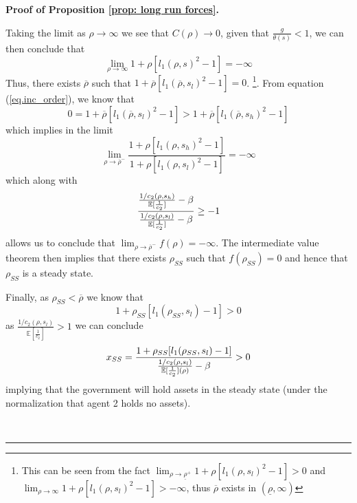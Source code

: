 \documentclass[thmsb,11pt]{article}
\newenvironment{proof}[1][Proof]{\noindent \textbf{#1.} }{\  \rule{0.5em}{0.5em}}
\begin{document}
\begin{proof}[Proof of Proposition \ref{prop: long run forces}]
\begin{description}
Taking the limit as $\rho\rightarrow\infty$ we see that $C(\rho)\rightarrow
0 $, given that $\frac g{\theta(s)} <1$, we can then conclude that
\begin{equation*}
\lim_{\rho\rightarrow\infty } 1+ \rho[l_1(\rho,s)^2-1] = -\infty
\end{equation*}
Thus, there exists $\overline \rho$ such that $1+\overline \rho[%
l_1(\overline \rho,s_l)^2-1] = 0$. \footnote{This can be seen from the fact $\lim_{\rho\rightarrow \underline
\rho^+} 1+\rho[l_1(\rho,s_l)^2 -1] > 0$ and $\lim_{\rho\rightarrow \infty } 1+\rho[l_1(\rho,s_l)^2 -1] > -\infty$, thus $\overline{\rho}$ exists in $(\underline{\rho},\infty)$ }. From equation (\ref{eq.inc_order}), we
know that
\begin{equation*}
0 = 1+\overline \rho[l_1(\overline \rho,s_l)^2-1] > 1+\overline \rho[%
l_1(\overline \rho,s_h)^2-1]
\end{equation*}
which implies in the limit
\begin{equation*}
\lim_{\rho\rightarrow \overline \rho^-}\frac{1+\rho[l_1(\rho,s_h)^2-1]}{1+%
\rho[l_1(\rho,s_l)^2-1]} = -\infty
\end{equation*}
which along with
\begin{equation*}
\frac{\frac{1/c_2(\rho,s_h)}{\mathbb{E}[\frac1{c_2}]}-\beta }{\frac{%
1/c_2(\rho,s_l)}{\mathbb{E}[\frac1{c_2}]}-\beta} \geq -1
\end{equation*}
allows us to conclude that $\lim_{\rho\rightarrow \overline \rho^-} f(\rho)
= -\infty$. The intermediate value theorem then implies that there exists $%
\rho_{SS}$ such that $f(\rho_{SS}) = 0$ and hence that $\rho_{SS}$ is a
steady state.

Finally, as $\rho_{SS} < \overline \rho$ we know that
\begin{equation*}
1+\rho_{SS}[l_1(\rho_{SS},s_l)-1] >0
\end{equation*}%
as $\frac{1/c_2(\rho,s_l)}{\mathbb{E}[\frac1{c_2}]} >1$ we can
conclude
\begin{equation*}
x_{SS} = \frac{1+\rho_{SS}[l_1(\rho_{SS},s_l)-1]}{\frac{1/c_2(\rho,s_l)}{%
\mathbb{E}[\frac1{c_2}](\rho)}-\beta} >0
\end{equation*}%
implying that the government will hold assets in the steady state (under the
normalization that agent 2 holds no assets).


\end{description}
\end{proof}
\end{document}
